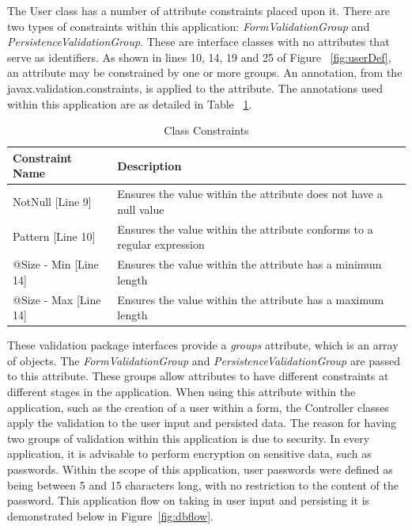 The User class has a number of attribute constraints placed upon it. There are two types of constraints within this application: \textit{FormValidationGroup} and \textit{PersistenceValidationGroup}. These are interface classes with no attributes that serve as identifiers. As shown in lines 10, 14, 19 and 25 of Figure ~\ref{fig:userDef}, an attribute may be constrained by one or more groups. An annotation, from the javax.validation.constraints, is applied to the attribute. The annotations used within this application are as detailed in Table ~\ref{fig:classConstraints}.

\begin{table}[H]
\caption{Class Constraints}
\begin{center}
    \begin{tabular}{ | l | l | p{5cm} |}
    \hline
    Constraint Name & Description\\ \hline
	NotNull [Line 9] & Ensures the value within the attribute does not have a null value\\ \hline
	Pattern [Line 10] & Ensures the value within the attribute conforms to a regular expression\\ \hline
    @Size - Min [Line 14] & Ensures the value within the attribute has a minimum length\\ \hline
	@Size - Max [Line 14] & Ensures the value within the attribute has a maximum length\\ \hline

    \end{tabular}
\end{center}

\label{fig:classConstraints}
\end{table}

These validation package interfaces provide a \textit{groups} attribute, which is an array of objects. The \textit{FormValidationGroup} and \textit{PersistenceValidationGroup} are passed to this attribute. These groups allow attributes to have different constraints at different stages in the application. When using this attribute within the application, such as the creation of a user within a form, the Controller classes apply the validation to the user input and persisted data. The reason for having two groups of validation within this application is due to security. In every application, it is advisable to perform encryption on sensitive data, such as passwords. Within the scope of this application, user passwords were defined as being between 5 and 15 characters long, with no restriction to the content of the password. This application flow on taking in user input and persisting it is demonstrated below in Figure~\ref{fig:dbflow}.

